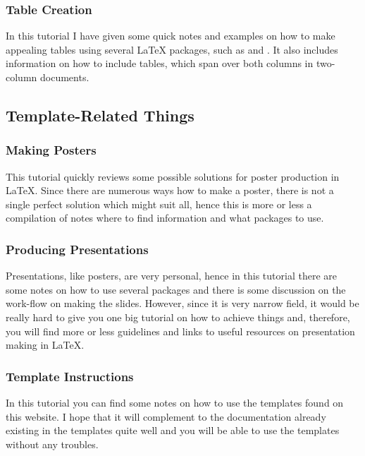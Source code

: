\documentclass[
    draft
    ]{scrartcl}
\begin{document}
%
\subsubsection{Table Creation}

%
In this tutorial I have given some quick notes and examples on how to make
    appealing tables using several \LaTeX{} packages, such as  and
    .
%
It also includes information on how to include tables, which span over both
    columns in two-column documents.

%
\subsection{Template-Related Things}

%
\subsubsection{Making Posters}

%
This tutorial quickly reviews some possible solutions for poster production in
    \LaTeX{}.
%
Since there are numerous ways how to make a poster, there is not a single
    perfect solution which might suit all, hence this is more or less a
    compilation of notes where to find information and what packages to use.

%    
\subsubsection{Producing Presentations}

%
Presentations, like posters, are very personal, hence in this tutorial there are
    some notes on how to use several packages and there is some discussion on
    the work-flow on making the slides.
%
However, since it is very narrow field, it would be really hard to give you one
    big tutorial on how to achieve things and, therefore, you will find more or
    less guidelines and links to useful resources on presentation making in
    \LaTeX{}.

%
\subsubsection{Template Instructions}

%
In this tutorial you can find some notes on how to use the templates found on
    this website.
%
I hope that it will complement to the documentation already existing in the
    templates quite well and you will be able to use the templates without any
    troubles.
\end{document}
